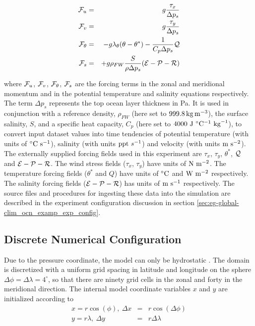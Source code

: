 \begin{eqnarray}
\label{eq:eg-global_forcing_pcoord}
\label{eq:eg-global_forcing_fu_pcoord}
{\cal F}_{u} & = & g\frac{\tau_{x}}{\Delta p_{s}}
\\
\label{eq:eg-global_forcing_fv_pcoord}
{\cal F}_{v} & = & g\frac{\tau_{y}}{\Delta p_{s}}
\\
\label{eq:eg-global_forcing_ft_pcoord}
{\cal F}_{\theta} & = & - g\lambda_{\theta} ( \theta - \theta^{\ast} ) 
 - \frac{1}{C_{p} \Delta p_{s}}{\cal Q}
\\
\label{eq:eg-global_forcing_fs_pcoord}
{\cal F}_{s} & = &
 + g\rho_{FW}\frac{S}{\rho\Delta p_{s}}({\cal E} - {\cal P} - {\cal R})
\end{eqnarray}

\noindent where ${\cal F}_{u}$, ${\cal F}_{v}$, ${\cal F}_{\theta}$,
${\cal F}_{s}$ are the forcing terms in the zonal and meridional
momentum and in the potential temperature and salinity equations
respectively.  The term $\Delta p_{s}$ represents the top ocean layer
thickness in Pa.  It is used in conjunction with a reference density,
$\rho_{FW}$ (here set to $999.8\,{\rm kg\,m^{-3}}$), the surface
salinity, $S$, and a specific heat capacity, $C_{p}$ (here set to
$4000~{\rm J}~^{\circ}{\rm C}^{-1}~{\rm kg}^{-1}$), to convert input
dataset values into time tendencies of potential temperature (with
units of $^{\circ}{\rm C}~{\rm s}^{-1}$), salinity (with units ${\rm
  ppt}~s^{-1}$) and velocity (with units ${\rm m}~{\rm s}^{-2}$).  The
externally supplied forcing fields used in this experiment are
$\tau_{x}$, $\tau_{y}$, $\theta^{\ast}$, $\cal{Q}$ and
$\cal{E}-\cal{P}-\cal{R}$. The wind stress fields ($\tau_x$, $\tau_y$)
have units of ${\rm N}~{\rm m}^{-2}$. The temperature forcing fields
($\theta^{\ast}$ and $Q$) have units of $^{\circ}{\rm C}$ and ${\rm
  W}~{\rm m}^{-2}$ respectively. The salinity forcing fields
($\cal{E}-\cal{P}-\cal{R}$) has units of ${\rm m}~{\rm s}^{-1}$
respectively. The source files and procedures for ingesting these data
into the simulation are described in the experiment configuration
discussion in section \ref{sec:eg-global-clim_ocn_examp_exp_config}.


\subsection{Discrete Numerical Configuration}


Due to the pressure coordinate, the model can only be hydrostatic
\citep{szoeke02}. The domain is discretized with a uniform grid
spacing in latitude and longitude on the sphere $\Delta \phi=\Delta
\lambda=4^{\circ}$, so that there are ninety grid cells in the zonal
and forty in the meridional direction.  The internal model coordinate
variables $x$ and $y$ are initialized according to
\begin{eqnarray}
x=r\cos(\phi),~\Delta x & = &r\cos(\Delta \phi) \\
y=r\lambda,~\Delta y &= &r\Delta \lambda 
\end{eqnarray}


